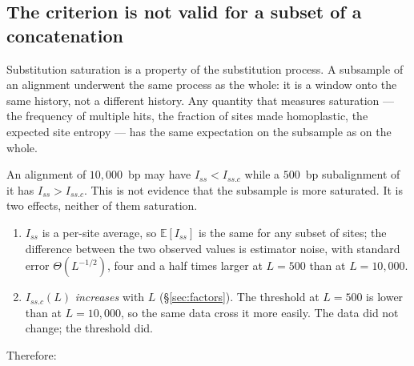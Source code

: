 \documentclass[preprint,12pt,authoryear]{elsarticle}
\newcommand{\Iss}{I_{ss}}
\newcommand{\Issc}{I_{ss.c}}
\newcommand{\E}{\mathbb{E}}
\theoremstyle{definition}
\theoremstyle{remark}
\begin{document}
\subsection{The criterion is not valid for a subset of a concatenation}
\label{sec:subset}

Substitution saturation is a property of the substitution process. A
subsample of an alignment underwent the same process as the whole: it is a
window onto the same history, not a different history. Any quantity that
measures saturation --- the frequency of multiple hits, the fraction of sites
made homoplastic, the expected site entropy --- has the same expectation on
the subsample as on the whole.

An alignment of $10{,}000$~bp may have $\Iss<\Issc$ while a $500$~bp
subalignment of it has $\Iss>\Issc$. This is not evidence that the subsample
is more saturated. It is two effects, neither of them saturation.

\begin{enumerate}
\item $\Iss$ is a per-site average, so $\E[\Iss]$ is the same for any subset
  of sites; the difference between the two observed values is estimator
  noise, with standard error $\Theta(L^{-1/2})$, four and a half times larger
  at $L=500$ than at $L=10{,}000$.
\item $\Issc(L)$ \emph{increases} with $L$ (\S\ref{sec:factors}). The
  threshold at $L=500$ is lower than at $L=10{,}000$, so the same data cross
  it more easily. The data did not change; the threshold did.
\end{enumerate}

Therefore:
\end{document}
